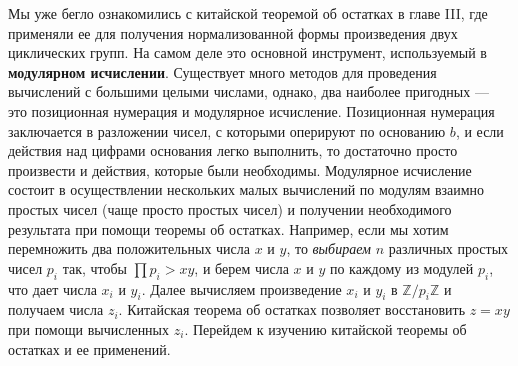 \documentclass{../../template/mai_book}
\begin{document}
    \noindent Мы уже бегло ознакомились с китайской теоремой об остатках в главе III, где применяли ее для получения нормализованной формы произведения двух циклических групп. На самом деле это основной инструмент, используемый в {\textbf{модулярном исчислении}}. Существует много методов для проведения вычислений с большими целыми числами, однако, два наиболее пригодных — это позиционная нумерация и модулярное исчисление. Позиционная нумерация заключается в разложении чисел, с которыми оперируют по основанию $b$, и если действия над цифрами основания легко выполнить, то достаточно просто произвести и действия, которые были необходимы. Модулярное исчисление состоит в осуществлении нескольких малых вычислений по модулям взаимно простых чисел (чаще просто простых чисел) и получении необходимого результата при помощи теоремы об остатках. Например, если мы хотим перемножить два положительных числа $x$ и $y$, то \textit{выбираем} $n$ различных простых чисел $p_i$ так, чтобы $\prod\nolimits p_i > xy$, и берем числа $x$ и $y$ по каждому из модулей $p_i$, что дает числа $x_i$ и $y_i$. Далее вычисляем произведение $x_i$ и $y_i$ в $\mathbb{Z}/p_i\mathbb{Z}$ и получаем числа $z_i$. Китайская теорема об остатках позволяет восстановить $z = xy$ при помощи вычисленных $z_i$. Перейдем к изучению китайской теоремы об остатках и ее применений.

    \sectiontop
\end{document}
